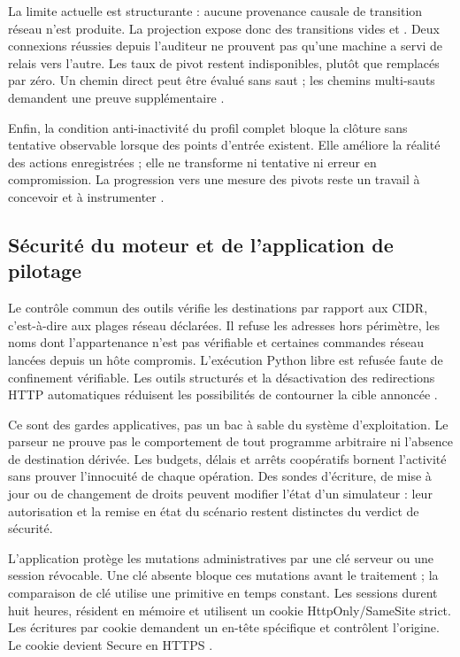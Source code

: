 \documentclass[11pt,a4paper]{article}
\DeclareRobustCommand{\code}[1]{{\small\path{#1}}}
\begin{document}
La limite actuelle est structurante : aucune provenance causale de transition
réseau n'est produite. La projection expose donc des transitions vides et
\code{transition_evidence_available=false}. Deux connexions réussies depuis
l'auditeur ne prouvent pas qu'une machine a servi de relais vers l'autre.
Les taux de pivot restent indisponibles, plutôt que remplacés par zéro.
Un chemin direct peut être évalué sans saut ; les chemins multi-sauts
demandent une preuve supplémentaire \cite{sec-evaluation}.

Enfin, la condition anti-inactivité du profil complet bloque la clôture
sans tentative
observable lorsque des points d'entrée existent. Elle améliore la réalité
des actions enregistrées ; elle ne transforme ni tentative ni erreur en
compromission. La progression vers une mesure des pivots reste un travail
à concevoir et à instrumenter \cite{sec-gate}.

\subsection{Sécurité du moteur et de l'application de pilotage}

Le contrôle commun des outils vérifie les destinations par rapport aux CIDR,
c'est-à-dire aux plages réseau déclarées. Il refuse les adresses hors
périmètre, les noms dont l'appartenance n'est pas vérifiable et certaines
commandes réseau lancées depuis un hôte compromis. L'exécution Python libre
est refusée faute de confinement vérifiable. Les outils structurés et la
désactivation des redirections HTTP automatiques réduisent les possibilités
de contourner la cible annoncée \cite{arch-executeur,sec-scope}.

Ce sont des gardes applicatives, pas un bac à sable du système d'exploitation.
Le parseur ne prouve pas le comportement de tout programme arbitraire ni
l'absence de destination dérivée. Les budgets, délais et arrêts coopératifs
bornent l'activité sans prouver l'innocuité de chaque opération. Des
sondes d'écriture, de mise à jour ou de changement de droits peuvent modifier
l'état d'un simulateur : leur autorisation et la remise en état du scénario
restent distinctes du verdict de sécurité.

L'application protège les mutations administratives par une clé serveur ou
une session révocable. Une clé absente bloque ces mutations avant le
traitement ; la comparaison de clé utilise une primitive en temps constant.
Les sessions durent huit heures, résident en mémoire et utilisent un cookie
HttpOnly/SameSite strict. Les écritures par cookie demandent un en-tête
spécifique et contrôlent l'origine. Le cookie devient Secure en HTTPS
\cite{sec-auth,sec-session}.
\end{document}
